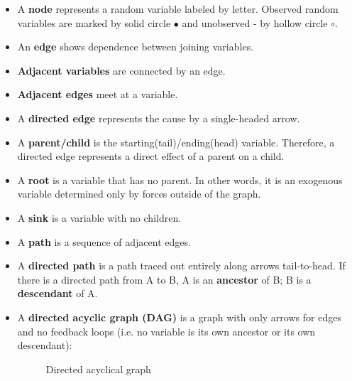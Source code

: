 \begin{itemize}

\item A \textbf{node} represents a random variable labeled by letter. Observed random variables are marked by solid circle $\bullet$ and unobserved - by hollow circle \( \circ \).

\item An \textbf{edge} shows dependence between joining variables.

\item \textbf{Adjacent variables} are connected by an edge.

\item \textbf{Adjacent edges} meet at a variable.

\item A \textbf{directed edge} represents the cause by a single-headed arrow.

\item A \textbf{parent/child} is the starting(tail)/ending(head) variable. Therefore, a directed edge represents a direct effect of a parent on a child.

\item A \textbf{root} is a variable that has no parent. In other words, it is an exogenous variable determined only by forces outside of the graph.

\item A \textbf{sink} is a variable with no children.

\item A \textbf{path} is a sequence of adjacent edges.

\item A \textbf{directed path} is a path traced out entirely along arrows tail-to-head. If there is a directed path from A to B,  A is an \textbf{ancestor} of B; B is a  \textbf{descendant} of A.

\item A \textbf{directed acyclic graph (DAG)} is a graph with only arrows for edges and no feedback loops (i.e. no variable is its own ancestor or its own descendant):

\begin{figure}[htp]\centering
\caption{Directed acyclical graph}
\end{figure}


\end{itemize}
